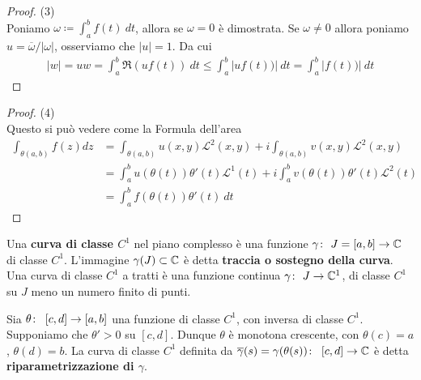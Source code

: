 \begin{proof} (3)\\
	Poniamo $\omega \coloneqq \int_{a}^{b} f(t)\ dt$, allora se $\omega = 0$ è dimostrata. Se $\omega \neq 0$ allora poniamo $u = \overline{\omega}/|\omega|$, osserviamo che $|u|=1$. Da cui
	\begin{equation*}
	\begin{aligned}
	|w| = uw = \int_{a}^b \Re(uf(t))\ dt \le \int_{a}^b |uf(t))|\ dt = \int_{a}^b |f(t))|\ dt  
	\end{aligned}
	\end{equation*}
\end{proof}

\begin{proof} (4)\\
	Questo si può vedere come la Formula dell'area  
	\begin{equation*}
	\begin{aligned}
	\int_{\theta(a,b)} f(z) dz & = \int_{\theta(a,b)} u(x,y) \mathcal{L}^2(x,y)
	+ i\int_{\theta(a,b)} v(x,y) \mathcal{L}^2(x,y)\\
	& = \int_a^b u(\theta(t))\theta'(t) \mathcal{L}^1(t) 
	+ i\int^b_a v(\theta(t))\theta'(t) \mathcal{L}^2(t)\\
	& = \int_a^b f(\theta(t)) \theta'(t)\ dt		
	\end{aligned}
	\end{equation*}
\end{proof}

\begin{definition}
	\label{defn:curva-c1}
	Una \textbf{curva di classe $C^1$} nel piano complesso è una funzione $\gamma \colon\ J=\left[a,b\right] \rightarrow \mathbb{C}$ di classe $C^1$. L'immagine $\gamma(J) \subset \mathbb{C}$ è detta \textbf{traccia o sostegno della curva}. Una curva di classe $C^1$ a tratti è una funzione continua $\gamma \colon\ J \rightarrow \mathbb{C}^1$, di classe $C^1$ su $J$ meno un numero finito di punti. 		
\end{definition}

\begin{definition}
	\label{defn:riparametrizzazione-curva-classe-c1}
	Sia $\theta \colon\ \left[c,d\right] \rightarrow \left[a,b\right]$ una funzione di classe $C^1$, con inversa di classe $C^1$. Supponiamo che $\theta' > 0$ su $\left[c, d\right]$. Dunque $\theta$ è monotona crescente, con $\theta(c) = a$, $\theta(d) = b$. La curva di classe $C^1$ definita da $\overline{\gamma}(s) = \gamma(\theta (s)) \colon\ \left[c,d\right] \rightarrow \mathbb{C}$ è detta \textbf{riparametrizzazione di $\gamma$}.
\end{definition}

